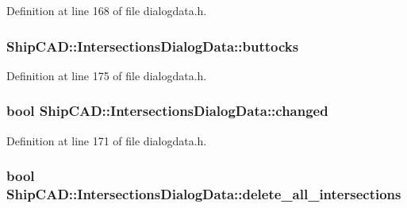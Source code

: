 Definition at line 168 of file dialogdata.\+h.

\subsubsection[{\texorpdfstring{buttocks}{buttocks}}]{ Ship\+C\+A\+D\+::\+Intersections\+Dialog\+Data\+::buttocks}\hypertarget{structShipCAD_1_1IntersectionsDialogData_a42e8714909a6cb3f20d4508e3ed3d7cd}{}\label{structShipCAD_1_1IntersectionsDialogData_a42e8714909a6cb3f20d4508e3ed3d7cd}


Definition at line 175 of file dialogdata.\+h.

\subsubsection[{\texorpdfstring{changed}{changed}}]{\setlength{\rightskip}{0pt plus 5cm}bool Ship\+C\+A\+D\+::\+Intersections\+Dialog\+Data\+::changed}\hypertarget{structShipCAD_1_1IntersectionsDialogData_a3f9b8b74cdacaed5cfdf2026dfaf2d75}{}\label{structShipCAD_1_1IntersectionsDialogData_a3f9b8b74cdacaed5cfdf2026dfaf2d75}


Definition at line 171 of file dialogdata.\+h.

\subsubsection[{\texorpdfstring{delete\+\_\+all\+\_\+intersections}{delete_all_intersections}}]{\setlength{\rightskip}{0pt plus 5cm}bool Ship\+C\+A\+D\+::\+Intersections\+Dialog\+Data\+::delete\+\_\+all\+\_\+intersections}\hypertarget{structShipCAD_1_1IntersectionsDialogData_ae423b73a2c8644594ac4c7f56125af9f}{}\label{structShipCAD_1_1IntersectionsDialogData_ae423b73a2c8644594ac4c7f56125af9f}



